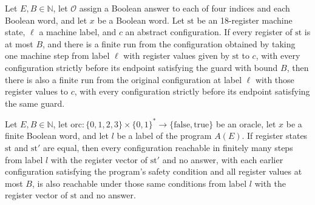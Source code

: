 \begin{lemma}
\label{Complexity.LogProg.SavitchARM.step_of}
\leanok
{}
Let $E,B\in\mathbb N$, let $\mathcal O$ assign a Boolean answer to each of four indices
and each Boolean word, and let $x$ be a Boolean word. Let $\mathrm{st}$ be an
18-register machine state, $\ell$ a machine label, and $c$ an abstract configuration. If
every register of $\mathrm{st}$ is at most $B$, and there is a finite run from the
configuration obtained by taking one machine step from label $\ell$ with register values
given by $\mathrm{st}$ to $c$, with every configuration strictly before its endpoint
satisfying the guard with bound $B$, then there is also a finite run from the original
configuration at label $\ell$ with those register values to $c$, with every
configuration strictly before its endpoint satisfying the same guard.
\end{lemma}

\begin{lemma}
\label{Complexity.LogProg.SavitchARM.cont}
\leanok
{}
Let $E,B\in\mathbb{N}$, let
$\mathrm{orc}\colon\{0,1,2,3\}\times\{0,1\}^*\to\{\mathrm{false},\mathrm{true}\}$ be an
oracle, let $x$ be a finite Boolean word, and let $l$ be a label of the program $A(E)$.
If register states $\mathrm{st}$ and $\mathrm{st}'$ are equal, then every configuration
reachable in finitely many steps from label $l$ with the register vector of
$\mathrm{st}'$ and no answer, with each earlier configuration satisfying the program’s
safety condition and all register values at most $B$, is also reachable under those same
conditions from label $l$ with the register vector of $\mathrm{st}$ and no answer.
\end{lemma}

